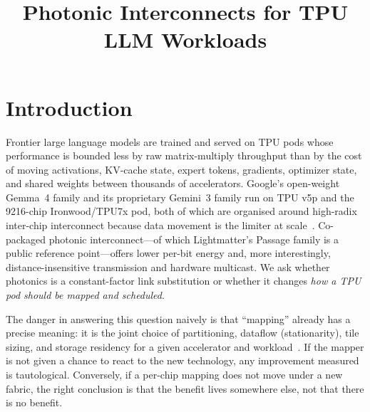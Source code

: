 \documentclass[conference]{IEEEtran}
\begin{document}
\title{Photonic Interconnects for TPU LLM Workloads}

\author{
\and
{}
}

\maketitle

\section{Introduction}
Frontier large language models are trained and served on TPU pods
whose performance is bounded less by raw matrix-multiply throughput
than by the cost of moving activations, KV-cache state, expert
tokens, gradients, optimizer state, and shared weights between
thousands of accelerators. Google's open-weight Gemma~4 family and
its proprietary Gemini~3 family run on TPU v5p and the 9216-chip
Ironwood/TPU7x pod, both of which are organised around high-radix
inter-chip interconnect because data movement is the limiter at
scale~\cite{tpuv5p,tpu7x,ironwood-blog}. Co-packaged photonic
interconnect---of which Lightmatter's Passage family is a public
reference point---offers lower per-bit energy and, more
interestingly, distance-insensitive transmission and hardware
multicast. We ask whether photonics is a constant-factor link
substitution or whether it changes \emph{how a TPU pod should be
mapped and scheduled}.

The danger in answering this question naively is that ``mapping''
already has a precise meaning: it is the joint choice of
partitioning, dataflow (stationarity), tile sizing, and storage
residency for a given accelerator and
workload~\cite{lec05-mapping,lec06-partitioning}. If the mapper is
not given a chance to react to the new technology, any improvement
measured is tautological. Conversely, if a per-chip mapping does
not move under a new fabric, the right conclusion is that the
benefit lives somewhere else, not that there is no benefit.
\end{document}
